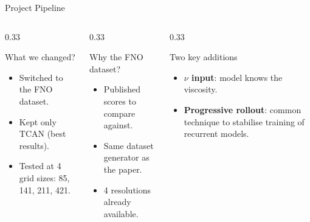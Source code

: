 \begin{frame}{Project Pipeline}
  \begin{columns}[t, totalwidth=\textwidth]
    \begin{column}{0.33\textwidth}
      \begin{block}{\centering \small What we changed?}
        \begin{itemize}\setlength\itemsep{0pt}\small
          \item \scriptsize Switched to the FNO dataset.
          \item \scriptsize Kept only TCAN (best results).
          \item \scriptsize Tested at 4 grid sizes: 85, 141, 211, 421.
        \end{itemize}
      \end{block}
    \end{column}
    \begin{column}{0.33\textwidth}
      \begin{block}{\centering \small Why the FNO dataset?}
        \begin{itemize}\setlength\itemsep{0pt}\small
          \item \scriptsize Published scores to compare against.
          \item \scriptsize Same dataset generator as the paper.
          \item \scriptsize {4 resolutions already available.}
        \end{itemize}
      \end{block}
    \end{column}
    \begin{column}{0.33\textwidth}
      \begin{block}{\centering \small Two key additions}
        \begin{itemize}\setlength\itemsep{0pt}\small
          \item \scriptsize {\textbf{$\nu$ input}: model knows the viscosity.}
          \item \scriptsize {\textbf{Progressive rollout}: common technique to stabilise training of recurrent models.}
        \end{itemize}
      \end{block}
    \end{column}
  \end{columns}

\end{frame}